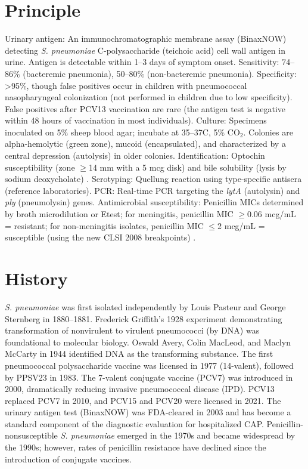 \section*{Principle}
Urinary antigen: An immunochromatographic membrane assay (BinaxNOW) detecting \textit{S. pneumoniae} C-polysaccharide (teichoic acid) cell wall antigen in urine. Antigen is detectable within 1--3 days of symptom onset. Sensitivity: 74--86\% (bacteremic pneumonia), 50--80\% (non-bacteremic pneumonia). Specificity: >95\%, though false positives occur in children with pneumococcal nasopharyngeal colonization (not performed in children due to low specificity). False positives after PCV13 vaccination are rare (the antigen test is negative within 48 hours of vaccination in most individuals). Culture: Specimens inoculated on 5\% sheep blood agar; incubate at 35--37\textdegree{}C, 5\% CO$_2$. Colonies are alpha-hemolytic (green zone), mucoid (encapsulated), and characterized by a central depression (autolysis) in older colonies. Identification: Optochin susceptibility (zone $\geq$14 mm with a 5 mcg disk) and bile solubility (lysis by sodium deoxycholate) \cite{werno2008medical}. Serotyping: Quellung reaction using type-specific antisera (reference laboratories). PCR: Real-time PCR targeting the \textit{lytA} (autolysin) and \textit{ply} (pneumolysin) genes. Antimicrobial susceptibility: Penicillin MICs determined by broth microdilution or Etest; for meningitis, penicillin MIC $\geq$0.06 mcg/mL = resistant; for non-meningitis isolates, penicillin MIC $\leq$2 mcg/mL = susceptible (using the new CLSI 2008 breakpoints) \cite{clsi2023performance}.

\section*{History}
\textit{S. pneumoniae} was first isolated independently by Louis Pasteur and George Sternberg in 1880--1881. Frederick Griffith's 1928 experiment demonstrating transformation of nonvirulent to virulent pneumococci (by DNA) was foundational to molecular biology. Oswald Avery, Colin MacLeod, and Maclyn McCarty in 1944 identified DNA as the transforming substance. The first pneumococcal polysaccharide vaccine was licensed in 1977 (14-valent), followed by PPSV23 in 1983. The 7-valent conjugate vaccine (PCV7) was introduced in 2000, dramatically reducing invasive pneumococcal disease (IPD). PCV13 replaced PCV7 in 2010, and PCV15 and PCV20 were licensed in 2021. The urinary antigen test (BinaxNOW) was FDA-cleared in 2003 and has become a standard component of the diagnostic evaluation for hospitalized CAP. Penicillin-nonsusceptible \textit{S. pneumoniae} emerged in the 1970s and became widespread by the 1990s; however, rates of penicillin resistance have declined since the introduction of conjugate vaccines.

